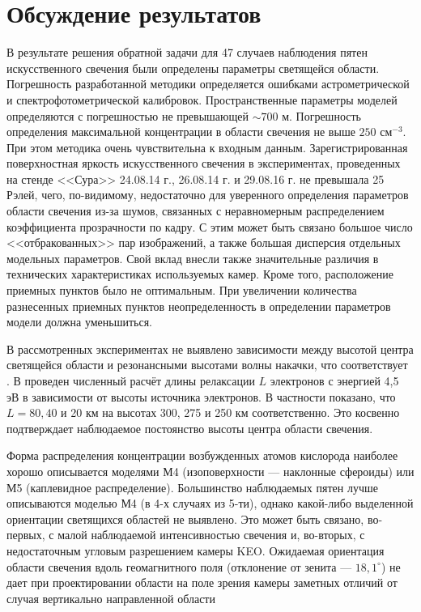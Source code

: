 \documentclass[12pt,a4paper]{article}
\begin{document}
\section{Обсуждение результатов} \label{sec:discuss}

В результате решения обратной задачи для 47 случаев наблюдения пятен искусственного свечения были определены параметры светящейся области. Погрешность разработанной методики определяется ошибками астрометрической и спектрофотометрической калибровок. Пространственные параметры моделей определяются с погрешностью не превышающей $\sim700$ м. Погрешность определения максимальной концентрации в области свечения не выше $250$ см$^{-3}$. При этом методика очень чувствительна к входным данным. Зарегистрированная поверхностная яркость искусственного свечения в экспериментах, проведенных на стенде <<Сура>> 24.08.14 г., 26.08.14 г. и 29.08.16 г. не превышала 25 Рэлей, чего, по-видимому, недостаточно для уверенного определения параметров области свечения из-за шумов, связанных с неравномерным распределением коэффициента прозрачности по кадру. С этим может быть связано большое число <<отбракованных>> пар изображений, а также большая дисперсия отдельных модельных параметров.
Свой вклад внесли также значительные различия в технических характеристиках используемых камер. Кроме того, расположение приемных пунктов было не оптимальным. При увеличении количества разнесенных приемных пунктов неопределенность в определении параметров модели должна уменьшиться.


В рассмотренных экспериментах не выявлено зависимости между высотой центра светящейся области и резонансными высотами волны накачки, что соответствует \cite{Gustavsson2001}.
В \cite{Vaskov1983} проведен численный расчёт длины релаксации $L$ электронов с энергией 4,5 эВ в зависимости от высоты источника электронов. В частности показано, что $L=80,40$ и 20 км на высотах 300, 275 и 250 км соответственно. Это косвенно подтверждает 
наблюдаемое постоянство высоты центра области свечения. 


Форма распределения концентрации возбужденных атомов кислорода наиболее хорошо описывается моделями М4 (изоповерхности --- наклонные сфероиды) или М5 (каплевидное распределение). Большинство наблюдаемых пятен лучше описываются моделью М4 (в 4-х случаях из 5-ти), однако какой-либо выделенной ориентации светящихся областей не выявлено. Это может быть связано, во-первых, с малой наблюдаемой интенсивностью свечения и, во-вторых, с недостаточным угловым разрешением камеры KEO. Ожидаемая ориентация области свечения вдоль геомагнитного поля (отклонение от зенита --- $18,1^\circ$) не дает при проектировании области на поле зрения камеры заметных отличий от случая вертикально направленной области
\end{document}
